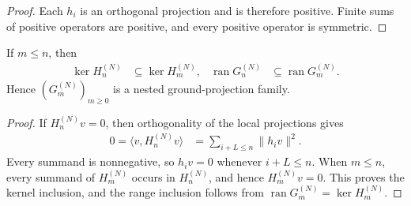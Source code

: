 \begin{proof}
    \leanok
    Each $h_i$ is an orthogonal projection and is therefore positive.  Finite
    sums of positive operators are positive, and every positive operator is
    symmetric.
\end{proof}

\begin{lemma}%
    \label{thm:fixed-volume-prefix-ground-projections-nested}
    \leanok
    If $m\leq n$, then
    \begin{align}
        \ker H_n^{(N)} & \subseteq\ker H_m^{(N)},
                       & \operatorname{ran}G_n^{(N)}
                       & \subseteq\operatorname{ran}G_m^{(N)}.
    \end{align}
    Hence $(G_m^{(N)})_{m\geq0}$ is a nested ground-projection family.
\end{lemma}

\begin{proof}
    \leanok
    If $H_n^{(N)}v=0$, then orthogonality of the local projections gives
    \begin{align}
        0=\langle v,H_n^{(N)}v\rangle
         & =\sum_{i+L\leq n}\lVert h_iv\rVert^2.
    \end{align}
    Every summand is nonnegative, so $h_iv=0$ whenever $i+L\leq n$.
    When $m\leq n$, every summand of $H_m^{(N)}$ occurs in $H_n^{(N)}$,
    and hence $H_m^{(N)}v=0$.  This proves the kernel inclusion, and the
    range inclusion follows from
    $\operatorname{ran}G_m^{(N)}=\ker H_m^{(N)}$.
\end{proof}

